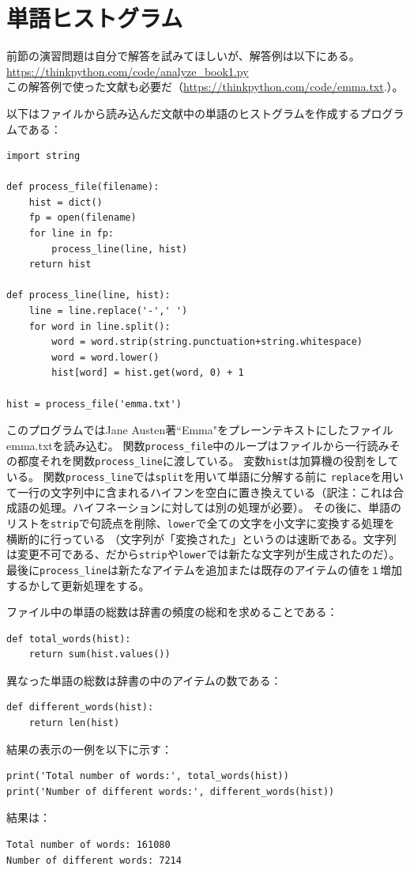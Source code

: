 \documentclass[a4j,12pt,makeidx]{jbook}
\begin{document}
\section{単語ヒストグラム}
前節の演習問題は自分で解答を試みてほしいが、解答例は以下にある。\\
\url{https://thinkpython.com/code/analyze_book1.py} \\
この解答例で使った文献も必要だ（\url{https://thinkpython.com/code/emma.txt}.）。 \par
以下はファイルから読み込んだ文献中の単語のヒストグラムを作成するプログラムである：
\begin{verbatim}
import string

def process_file(filename):
    hist = dict()
    fp = open(filename)
    for line in fp:
        process_line(line, hist)
    return hist

def process_line(line, hist):
    line = line.replace('-',' ')
    for word in line.split():
        word = word.strip(string.punctuation+string.whitespace)
        word = word.lower()
        hist[word] = hist.get(word, 0) + 1

hist = process_file('emma.txt')
\end{verbatim}
このプログラムではJane Austen著``Emma"をプレーンテキストにしたファイルemma.txtを読み込む。
関数{\tt process\_file}中のループはファイルから一行読みその都度それを関数{\tt process\_line}に渡している。
変数{\tt hist}は加算機の役割をしている。
関数{\tt process\_line}では{\tt split}を用いて単語に分解する前に
{\tt replace}を用いて一行の文字列中に含まれるハイフンを空白に置き換えている（訳注：これは合成語の処理。ハイフネーションに対しては別の処理が必要）。
その後に、単語のリストを{\tt strip}で句読点を削除、{\tt lower}で全ての文字を小文字に変換する処理を横断的に行っている
（文字列が「変換された」というのは速断である。文字列は変更不可である、だから{\tt strip}や{\tt lower}では新たな文字列が生成されたのだ）。
最後に{\tt process\_line}は新たなアイテムを追加または既存のアイテムの値を{\tt １}増加するかして更新処理をする。 \par
ファイル中の単語の総数は辞書の頻度の総和を求めることである：
\begin{verbatim}
def total_words(hist):
    return sum(hist.values())
\end{verbatim}
異なった単語の総数は辞書の中のアイテムの数である：
\begin{verbatim}
def different_words(hist):
    return len(hist)
\end{verbatim}
結果の表示の一例を以下に示す：
\begin{verbatim}
print('Total number of words:', total_words(hist))
print('Number of different words:', different_words(hist))
\end{verbatim}
結果は：
\begin{verbatim}
Total number of words: 161080
Number of different words: 7214
\end{verbatim}
%
\end{document}
